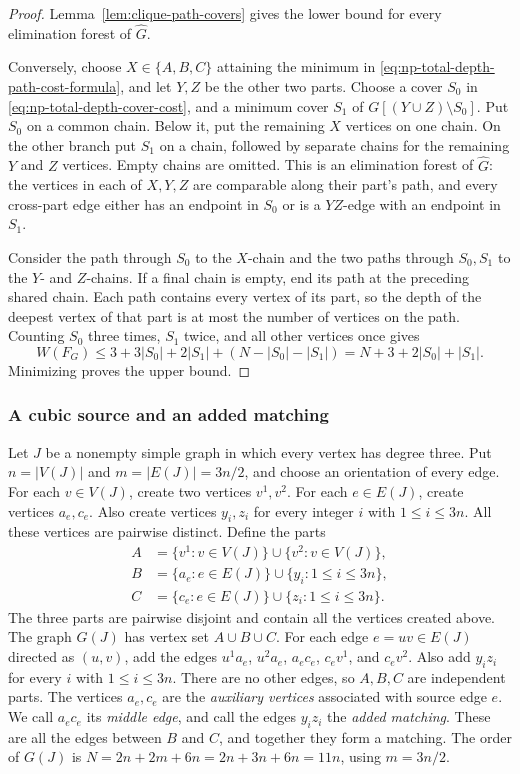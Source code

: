 \begin{proof}
Lemma~\ref{lem:clique-path-covers} gives the lower bound for every
elimination forest of $\widehat G$.

Conversely, choose $X\in\{A,B,C\}$ attaining the minimum in
\eqref{eq:np-total-depth-path-cost-formula}, and let $Y,Z$ be the other
two parts. Choose a cover $S_0$ in
\eqref{eq:np-total-depth-cover-cost}, and a minimum cover $S_1$ of
$G[(Y\cup Z)\setminus S_0]$. Put $S_0$ on a common chain.
Below it, put the remaining $X$ vertices on one chain. On the other
branch put $S_1$ on a chain, followed by separate chains for the
remaining $Y$ and $Z$ vertices. Empty chains are omitted. This is
an elimination forest of $\widehat G$: the vertices in each of $X,Y,Z$
are comparable along their part's path, and every cross-part edge either
has an endpoint in $S_0$ or is a $YZ$-edge with an endpoint in $S_1$.

Consider the path through $S_0$ to the $X$-chain and the two paths
through $S_0,S_1$ to the $Y$- and $Z$-chains. If a final chain is
empty, end its path at the preceding shared chain. Each path contains
every vertex of its part, so the depth of the deepest vertex of that
part is at most the number of vertices on the path. Counting $S_0$
three times, $S_1$ twice, and all other vertices once gives
\[
 W(F_G)\le 3+3|S_0|+2|S_1|+(N-|S_0|-|S_1|)
          =N+3+2|S_0|+|S_1|.
\]
Minimizing proves the upper bound.
\end{proof}

\subsubsection{A cubic source and an added matching}

Let $J$ be a nonempty simple graph in which every vertex has degree
three. Put $n=|V(J)|$ and $m=|E(J)|=3n/2$, and choose an orientation
of every edge. For each $v\in V(J)$, create two vertices $v^1,v^2$.
For each $e\in E(J)$, create vertices $a_e,c_e$. Also create vertices
$y_i,z_i$ for every integer $i$ with $1\le i\le3n$. All these
vertices are pairwise distinct. Define the parts
\[
\begin{aligned}
 A&=\{v^1:v\in V(J)\}\cup\{v^2:v\in V(J)\},\\
 B&=\{a_e:e\in E(J)\}\cup\{y_i:1\le i\le3n\},\\
 C&=\{c_e:e\in E(J)\}\cup\{z_i:1\le i\le3n\}.
\end{aligned}
\]
The three parts are pairwise disjoint and contain all the vertices
created above.
The graph $G(J)$ has vertex set $A\cup B\cup C$. For each edge
$e=uv\in E(J)$ directed as $(u,v)$, add the edges $u^1a_e$, $u^2a_e$, $a_ec_e$,
$c_ev^1$, and $c_ev^2$. Also add $y_iz_i$ for every $i$ with
$1\le i\le3n$. There are no other edges, so $A,B,C$ are independent
parts. The vertices $a_e,c_e$ are the
\emph{auxiliary vertices} associated with source edge $e$.
We call $a_ec_e$ its \emph{middle edge},
and call the edges $y_iz_i$ the \emph{added matching}. These are all
the edges between $B$ and $C$, and together they form a matching. The
order of $G(J)$ is $N=2n+2m+6n=2n+3n+6n=11n$, using
$m=3n/2$.

